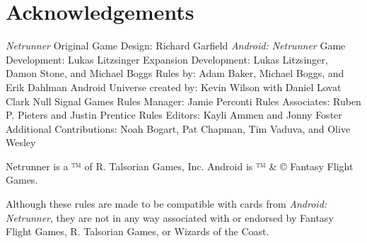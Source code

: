 \documentclass{article}
\begin{document}
\section*{Acknowledgements}

\begin{outline}[enumerate]
\1 \emph{Netrunner} Original Game Design: Richard Garfield
\1 \emph{Android: Netrunner}
  \2 Game Development: Lukas Litzsinger
  \2 Expansion Development: Lukas Litzsinger, Damon Stone, and Michael Boggs
  \2 Rules by: Adam Baker, Michael Boggs, and Erik Dahlman
  \2 Android Universe created by: Kevin Wilson with Daniel Lovat Clark
\1 Null Signal Games
  \2 Rules Manager: Jamie Perconti
  \2 Rules Associates: Ruben P. Pieters and Justin Prentice
  \2 Rules Editors: Kayli Ammen and Jonny Foster
  \2 Additional Contributions: Noah Bogart, Pat Chapman, Tim Vaduva, and Olive Wesley
\end{outline}

\noindent
Netrunner is a ™ of R. Talsorian Games, Inc. Android is ™ \& © Fantasy Flight Games.

\noindent
Although these rules are made to be compatible with cards from \emph{Android: Netrunner}, they are not in any way associated with or endorsed by Fantasy Flight Games, R. Talsorian Games, or Wizards of the Coast.
\end{document}
